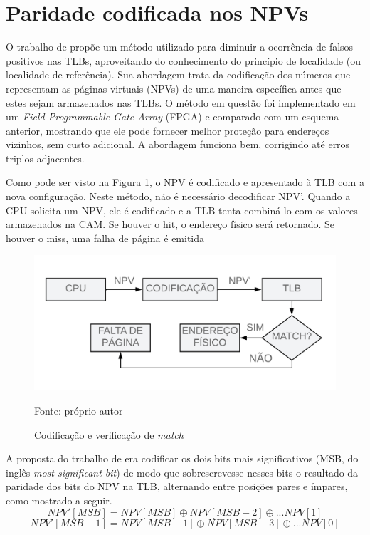 \section{Paridade codificada nos NPVs}

O trabalho de \cite{sanchez2019reducing} propõe um método utilizado para diminuir a ocorrência de falsos positivos nas TLBs, aproveitando do conhecimento do princípio de localidade (ou localidade de referência). Sua abordagem trata da codificação dos números que representam as páginas virtuais (NPVs) de uma maneira específica antes que estes sejam armazenados nas TLBs. O método em questão foi implementado em um\textit{ Field Programmable Gate Array} (FPGA) e comparado com um esquema anterior, mostrando que ele pode fornecer melhor proteção para endereços vizinhos, sem custo adicional. A abordagem funciona bem, corrigindo até erros triplos adjacentes. 

Como pode ser visto na Figura \ref{fig:codeS}, o NPV é codificado e apresentado à TLB com a nova configuração. Neste método, não é necessário decodificar NPV’. Quando a CPU solicita um NPV, ele é codificado e a TLB tenta combiná-lo com os valores armazenados na CAM. Se houver o hit, o endereço físico será retornado. Se houver o miss, uma falha de página é emitida

\begin{figure}[ht]
    \centering
    \includegraphics[scale=0.9]{figuras/match.png}
    \caption{Codificação e verificação de \textit{match}}{Fonte: próprio autor}
    \label{fig:codeS}
\end{figure}

A proposta do trabalho de \cite{sanchez2019reducing} era codificar os dois bits mais significativos (MSB, do inglês \textit{most significant bit}) de modo que sobrescrevesse nesses bits o resultado da paridade dos bits do NPV na TLB, alternando entre posições pares e ímpares, como mostrado a seguir.
\begin{equation}
    NPV'[MSB] = NPV[MSB] \oplus NPV[MSB-2] \oplus ... NPV[1]
\end{equation}
\begin{equation}
    NPV'[MSB-1] = NPV[MSB-1] \oplus NPV[MSB-3] \oplus ... NPV[0]
\end{equation}    
    

